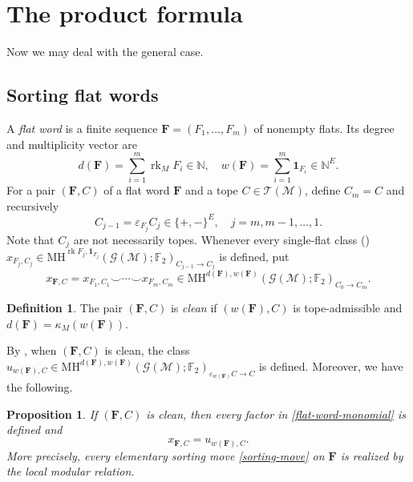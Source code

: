 \documentclass[10pt]{amsart}
\theoremstyle{plain}
\newtheorem{proposition}[theorem]{Proposition}
\theoremstyle{definition}
\newtheorem{definition}[theorem]{Definition}
\newcommand{\one}{\mathbf{1}}
\newcommand{\NN}{\mathbb{N}}
\newcommand{\T}{\mathcal{T}}
\newcommand{\G}{\mathcal{G}}
\newcommand{\MH}{\mathrm{MH}}
\newcommand{\M}{\mathcal{M}}
\newcommand{\rk}{\operatorname{rk}}
\newcommand{\eps}{\varepsilon}
\newcommand{\Ftwo}{\mathbb F_2}
\newcommand{\bF}{\boldsymbol{F}}
\begin{document}
\section{The product formula}
\label{main-result}

Now we may deal with the general case.

\subsection{Sorting flat words}

A \emph{flat word} is a finite sequence $\bF=(F_1,\ldots,F_m)$ of nonempty flats. Its degree and multiplicity vector are
\[
d(\bF)=\sum_{i=1}^m\rk_MF_i\in\NN, \quad w(\bF)=\sum_{i=1}^m\one_{F_i}\in\NN^E.
\]
For a pair $(\bF,C)$ of a flat word $\bF$ and a tope $C\in\T(\M)$, define $C_m=C$ and recursively
\[
C_{j-1}=\eps_{F_j}C_j\in\{+,-\}^E, \quad j=m,m-1,\ldots,1.
\]
Note that $C_j$ are not necessarily topes. Whenever every single-flat class () $x_{F_j,C_j}\in\MH^{\rk F_j,\one_{F_j}}(\G(\M);\Ftwo)_{C_{j-1}\to C_j}$ is defined, put
\begin{equation}\label{flat-word-monomial}
x_{\bF,C}=x_{F_1,C_1}\smile\cdots \smile x_{F_m,C_m}\in\MH^{d(\bF),w(\bF)}(\G(\M);\Ftwo)_{C_0\to C_m}.
\end{equation}

\begin{definition}
The pair $(\bF,C)$ is \emph{clean} if $(w(\bF),C)$ is tope-admissible and $d(\bF)=\kappa_M(w(\bF))$.
\end{definition}

By , when $(\bF,C)$ is clean, the class $u_{w(\bF),C}\in\MH^{d(\bF),w(\bF)}(\G(\M);\Ftwo)_{\eps_{w(\bF)}C\to C}$ is defined. Moreover, we have the following.

\begin{proposition}\label{modular-straightening}
If $(\bF,C)$ is clean, then every factor in \eqref{flat-word-monomial} is defined and
\[
x_{\bF,C}=u_{w(\bF),C}.
\]
More precisely, every elementary sorting move \eqref{sorting-move} on $\bF$ is realized by the local modular relation.
\end{proposition}
\end{document}
